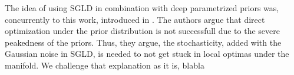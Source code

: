 
The idea of using SGLD in combination with deep parametrized priors was, concurrently to this work, introduced in \textcite{jayaramSource2020}. The authors argue that direct optimization under the prior distribution is not successfull due to the severe peakedness of the priors. Thus, they argue, the stochasticity, added with the Gaussian noise in SGLD, is needed to not get stuck in local optimas under the manifold. We challenge that explanation as it is, blabla
